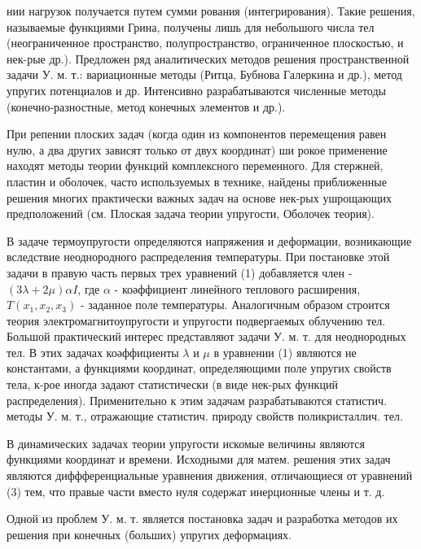 \documentclass[10pt]{article}
\begin{document}
нии нагрузок получается путем сумми рования (интегрирования). Такие решения, называемые функциями Грина, получены лишь для небольшого числа тел (неограниченное пространство, полупространство, ограниченное плоскостью, и нек-рые др.). Предложен ряд аналитических методов решения пространственной задачи У. м. т.: вариационные методы (Ритца, Бубнова Галеркина и др.), метод упругих потенциалов и др. Интенсивно разрабатываются численные методы (конечно-разностные, метод конечных элементов и др.).



При репении плоских задач (когда один из компонентов перемещения равен нулю, а два других зависят только от двух координат) ши рокое применение находят методы теории функций комплексного переменного. Для стержней, пластин и оболочек, часто используемых в технике, найдены приближенные решения многих практически важных задач на основе нек-рых ушрощающих предположений (см. Плоская задача теории упругости, Оболочек теория).



В задаче термоупругости определяются напряжения и деформации, возникающие вследствие неоднородного распределения температуры. При постановке этой задачи в правую часть первых трех уравнений (1) добавляется член - $(3 \lambda+2 \mu) \alpha I$, где $\alpha$ - коәффициент линейного теплового расширения, $T\left(x_{1}, x_{2}, x_{3}\right)$ - заданное поле температуры. Аналогичным образом строится теория электромагнитоупругости и упругости подвергаемых облучению тел. Большой практический интерес представляют задачи У. м. т. для неоднородных тел. В этих задачах коәффициенты $\lambda$ и $\mu$ в уравнении (1) являются не константами, а функциями координат, определяющими поле упругих свойств тела, к-рое иногда задают статистически (в виде нек-рых функций распределения). Применительно к этим задачам разрабатываются статистич. методы У. м. т., отражающие статистич. природу свойств поликристаллич. тел.



В динамических задачах теории упругости искомые величины являются функциями координат и времени. Исходными для матем. решения этих задач являются диффференциальные уравнения движения, отличающиеся от уравнений (3) тем, что правые части вместо нуля содержат инерционные члены и т. д.



Одной из проблем У. м. т. является постановка задач и разработка методов их решения при конечных (больших) упругих деформациях.
\end{document}

